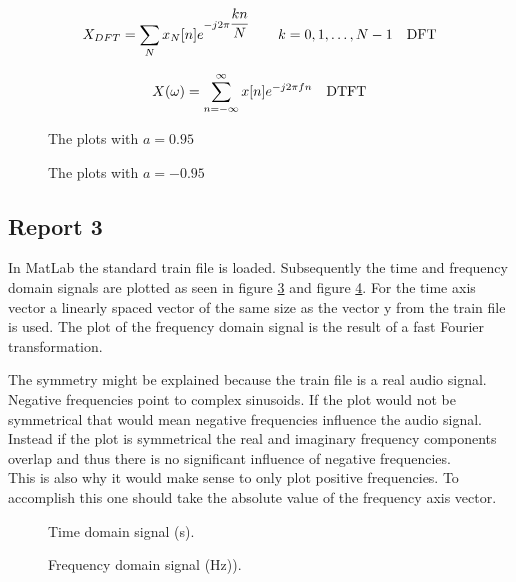 \documentclass[final]{scrreprt} %
\begin{document}
\begin{equation}
X_{DFT} = \sum_{N} x_N[n]e^{-j2\pi \dfrac{kn}{N}} \quad \quad k = 0, 1, \dots, N - 1 \quad \text{DFT}\\
\label{eq:DFT}
\end{equation}

\begin{equation}
X(\omega) = \sum_{n= -\infty}^{\infty} x[n]e^{-j2\pi fn} \quad \text{DTFT}\\
\label{eq:DTFT}
\end{equation}

\begin{figure}[H]
	\centering
    	\setlength\figureheight{3.5cm}
    	\setlength{}
    	    	
    	\caption{The plots with $a=0.95$}
    	\label{fig:a0.95-plots}
\end{figure}
\begin{figure}[H]
	\centering
    	\setlength\figureheight{3.5cm}
    	\setlength{}
    	    	
    	\caption{The plots with $a=-0.95$}
    	\label{fig:a0.-95-plots}
\end{figure}

\subsection{Report 3}

In MatLab the standard train file is loaded. 
Subsequently the time and frequency domain signals are plotted as seen in figure \ref{fig:train_time} and figure \ref{fig:train_freq}. 
For the time axis vector a linearly spaced vector of the same size as the vector y from the train file is used. 
The plot of the frequency domain signal is the result of a fast Fourier transformation.

The symmetry might be explained because the train file is a real audio signal. 
Negative frequencies point to complex sinusoids. 
If the plot would not be symmetrical that would mean negative frequencies influence the audio signal. 
Instead if the plot is symmetrical the real and imaginary frequency components overlap and thus there is no significant influence of negative frequencies.\\
This is also why it would make sense to only plot positive frequencies.
To accomplish this one should take the absolute value of the frequency axis vector.
\begin{figure}[H]
    \centering
	\setlength\figureheight{6cm}
    	\setlength\figurewidth{14cm}
	
	\caption{Time domain signal (s).}
	\label{fig:train_time}
\end{figure}
\begin{figure}[H]
    \centering
	\setlength\figureheight{6cm}
    	\setlength\figurewidth{14cm}
	
	\caption{Frequency domain signal (Hz)).}
	\label{fig:train_freq}
\end{figure}
\end{document}
